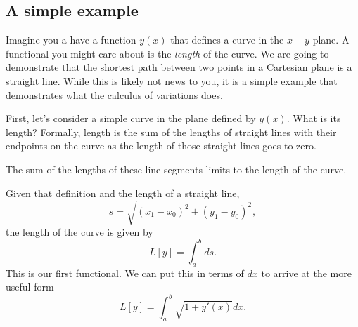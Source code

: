 
\subsection{A simple example}
Imagine you a have a function $y(x)$ that defines a curve in the $x-y$ plane. A functional you might care about is the \emph{length} of the curve. We are going to demonstrate that the shortest path between two points in a Cartesian plane is a straight line. While this is likely not news to you, it is a simple example that demonstrates what the calculus of variations does.

First, let's consider a simple curve in the plane defined by $y(x)$. What is its length? Formally, length is the sum of the lengths of straight lines with their endpoints on the curve as the length of those straight lines goes to zero. 
\begin{marginfigure}
  \caption{The sum of the lengths of these line segments limits to the length of the curve.}
\end{marginfigure}
Given that definition and the length of a straight line,
\begin{equation}
  \label{eq:line_seg}
  s = \sqrt{(x_1 - x_0)^2 + (y_1 - y_0)^2},  
\end{equation}
the length of the curve is given by
\begin{equation}
  \label{eq:curve_length_1}
  L[y] = \int_a^b ds.
\end{equation}
This is our first functional. We can put this in terms of $dx$ to arrive at the more useful form
\begin{equation}
  \label{eq:curve_length_final}
  L[y] = \int_a^b \sqrt{1 + y'(x)} dx.
\end{equation}

